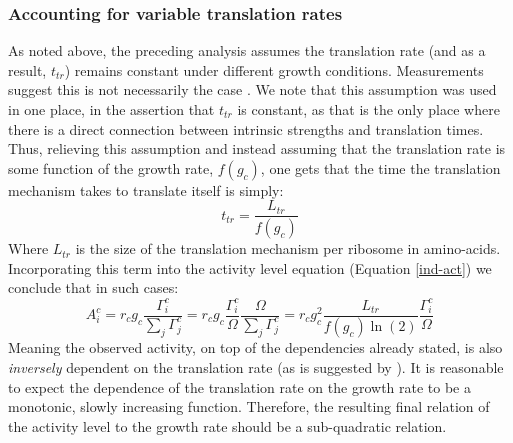 \documentclass[a4page,notitlepage]{article}
\begin{document}
\subsubsection{Accounting for variable translation rates}
\label{nonconst-trans}
As noted above, the preceding analysis assumes the translation rate (and as a result, $t_{tr}$) remains constant under different growth conditions.
Measurements suggest this is not necessarily the case \parencite{Liang2000}.
We note that this assumption was used in one place, in the assertion that $t_{tr}$ is constant, as that is the only place where there is a direct connection between intrinsic strengths and translation times.
Thus, relieving this assumption and instead assuming that the translation rate is some function of the growth rate, $f(g_c)$, one gets that the time the translation mechanism takes to translate itself is simply:
\begin{equation}
t_{tr}=\frac{L_{tr}}{f(g_c)}
\end{equation}
Where $L_{tr}$ is the size of the translation mechanism per ribosome in amino-acids.
Incorporating this term into the activity level equation (Equation \ref{ind-act}) we conclude that in such cases:
\begin{equation}
A^c_i=r_c g_c \frac{\Gamma^c_i}{\sum_{j}\Gamma^c_j}=r_c g_c \frac{\Gamma^c_i}{\Omega}\frac{\Omega}{\sum_{j}\Gamma^c_j}=r_c g_c^2\frac{L_{tr}}{f(g_c)\ln(2)}\frac{\Gamma^c_i}{\Omega}
\end{equation}
Meaning the observed activity, on top of the dependencies already stated, is also \emph{inversely} dependent on the translation rate (as is suggested by \cite{Scott2010b}).
It is reasonable to expect the dependence of the translation rate on the growth rate to be a monotonic, slowly increasing function.
Therefore, the resulting final relation of the activity level to the growth rate should be a sub-quadratic relation.
\end{document}
